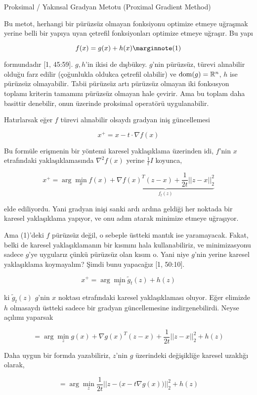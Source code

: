 \documentclass[12pt,fleqn]{article}\usepackage{../../common}
\begin{document}
Proksimal / Yakınsal Gradyan Metotu (Proximal Gradient Method) 

Bu metot, herhangi bir pürüzsüz olmayan fonksiyonu optimize etmeye uğraşmak
yerine belli bir yapıya uyan çetrefil fonksiyonları optimize etmeye
uğraşır. Bu yapı

$$
f(x) = g(x) + h(x) 
\mlabel{1}
$$

formundadır [1, 45:59]. $g,h$'in ikisi de dışbükey. $g$'nin pürüzsüz,
türevi alınabilir olduğu farz edilir (çoğunlukla oldukca çetrefil olabilir)
ve $\operatorname{dom}(g) = \mathbb{R}^n$, $h$ ise pürüzsüz olmayabilir. Tabii pürüzsüz
artı pürüzsüz olmayan iki fonksısyon toplamı kriterin tamamını pürüzsüz
olmayan hale çevirir. Ama bu toplam daha basittir denebilir, onun üzerinde
proksimal operatörü uygulanabilir.

Hatırlarsak eğer $f$ türevi alınabilir olsaydı gradyan iniş güncellemesi 

$$
x^{+} = x - t \cdot \nabla f(x)
$$

Bu formüle erişmenin bir yöntemi karesel yaklaşıklama üzerinden idi,
$f$'nin $x$ etrafındaki yaklaşıklamasında $\nabla^2f(x)$ yerine
$\frac{1}{t} I$ koyunca,

$$
x^{+} = \arg\min_x f(x) + 
\underbrace{
  \nabla f(x)^T (z-x) + \frac{1}{2t} ||z-x||_2^2 
}_{f_t(z)}
$$

elde ediliyordu. Yani gradyan inişi sanki ardı ardına geldiği her noktada
bir karesel yaklaşıklama yapıyor, ve onu adım atarak minimize etmeye
uğraşıyor.

Ama (1)'deki $f$ pürüzsüz değil, o sebeple üstteki mantık ise
yaramayacak. Fakat, belki de karesel yaklaşıklamanın bir kısmını hala
kullanabiliriz, ve minimizasyonu sadece $g$'ye uygularız çünkü pürüzsüz
olan kısım o. Yani niye $g$'nin yerine karesel yaklaşıklama koymayalım?
Şimdi bunu yapacağız [1, 50:10]. 

$$
x^{+} = \arg\min_z \tilde{g}_t(z) + h(z)
$$

ki $\tilde{g}_t(z)$ $g$'nin $x$ noktası etrafındaki karesel yaklaşıklaması
oluyor.  Eğer elimizde $h$ olmasaydı üstteki sadece bir gradyan
güncellemesine indirgenebilirdi. Neyse açılımı yaparsak

$$
= \arg\min_z g(x) + \nabla g(x)^T (z-x) + \frac{1}{2t} ||z-x||_2^2 + h(z)
$$

Daha uygun bir formda yazabiliriz, $z$'nin $g$ üzerindeki değişikliğe
karesel uzaklığı olarak,

$$
= \arg\min_z \frac{1}{2t} 
\big|\big| z - \big( x-t\nabla g(x) \big) \big|\big|_2^2 + 
h(z)
$$
\end{document}
